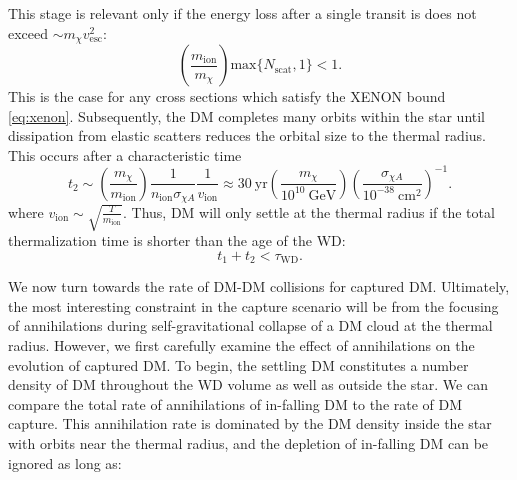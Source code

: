 \documentclass[preprintnumbers,amsmath,amssymb,prd,superscriptaddress]{revtex4}
\newcommand{\GeV}{\text{GeV}}
\newcommand{\cm}{\text{cm}}
\def\r{\right)}
\def\l{\left(}
\begin{document}
This stage is relevant only if the energy loss after a single transit is does not exceed $\sim m_\chi v_\text{esc}^2$:
\begin{equation}
\l \frac{m_\text{ion}}{m_\chi} \r \text{max}\{N_\text{scat},1\} < 1. 
\end{equation}
This is the case for any cross sections which satisfy the XENON bound \eqref{eq:xenon}. 
Subsequently, the DM completes many orbits within the star until dissipation from elastic scatters reduces the orbital size to the thermal radius.
This occurs after a characteristic time
\begin{equation}
t_2 \sim \l \frac{m_\chi}{m_\text{ion}} \r \frac{1}{n_\text{ion} \sigma_{\chi A}} \frac{1}{v_\text{ion}} \approx 30 ~\text{yr} \l \frac{m_\chi}{10^{10} ~\GeV} \r \l \frac{\sigma_{\chi A}}{10^{-38} ~\cm^2} \r^{-1}. 
\end{equation}
where $v_\text{ion} \sim \sqrt{\frac{T}{m_\text{ion}}}$.  
Thus, DM will only settle at the thermal radius if the total thermalization time is shorter than the age of the WD:
\begin{equation}
t_1 + t_2 < \tau_\text{WD}.
\end{equation}

We now turn towards the rate of DM-DM collisions for captured DM. 
Ultimately, the most interesting constraint in the capture scenario will be from the focusing of annihilations during self-gravitational collapse of a DM cloud at the thermal radius.
However, we first carefully examine the effect of annihilations on the evolution of captured DM. 
To begin, the settling DM constitutes a number density of DM throughout the WD volume as well as outside the star. 
We can compare the total rate of annihilations of in-falling DM to the rate of DM capture.  
This annihilation rate is dominated by the DM density inside the star with orbits near the thermal radius, and the depletion of in-falling DM can be ignored as long as:
\end{document}
